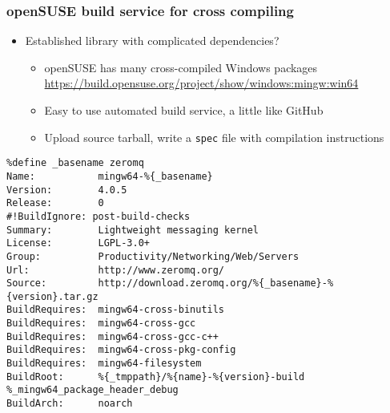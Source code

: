\documentclass[compressed,dvips,letter]{beamer}
\begin{document}
\begin{frame}[fragile]\frametitle{openSUSE build service for cross compiling}

\begin{itemize}
  \item Established library with complicated dependencies?
  \begin{itemize}
    \item openSUSE has many cross-compiled Windows packages \url{https://build.opensuse.org/project/show/windows:mingw:win64}
    \item Easy to use automated build service, a little like GitHub
    \item Upload source tarball, write a \texttt{spec} file with compilation instructions
  \end{itemize}
\end{itemize}
{\tiny
\begin{verbatim}
%define _basename zeromq
Name:           mingw64-%{_basename}
Version:        4.0.5
Release:        0
#!BuildIgnore: post-build-checks
Summary:        Lightweight messaging kernel
License:        LGPL-3.0+
Group:          Productivity/Networking/Web/Servers
Url:            http://www.zeromq.org/
Source:         http://download.zeromq.org/%{_basename}-%{version}.tar.gz
BuildRequires:  mingw64-cross-binutils
BuildRequires:  mingw64-cross-gcc
BuildRequires:  mingw64-cross-gcc-c++
BuildRequires:  mingw64-cross-pkg-config
BuildRequires:  mingw64-filesystem
BuildRoot:      %{_tmppath}/%{name}-%{version}-build
%_mingw64_package_header_debug
BuildArch:      noarch
\end{verbatim}
}
\end{frame}
%
%
\end{document}
